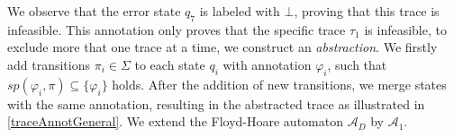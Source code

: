 We observe that the error state $q_7$ is labeled with $\bot$, proving that this trace is infeasible. This annotation only proves that the specific trace $\tau_1$ is infeasible, to exclude more that one trace at a time, we construct an \textsl{abstraction}. We firstly add transitions $ \pi_i \in \Sigma$ to each state $q_i$ with annotation $\varphi_i$, such that $sp(\varphi_i, \pi) \subseteq \{\varphi_i\}$ holds. After the addition of new transitions, we merge states with the same annotation, resulting in the abstracted trace as illustrated in \ref{traceAnnotGeneral}. We extend the Floyd-Hoare automaton $\mathcal{A}_D$ by $\mathcal{A}_1$.


